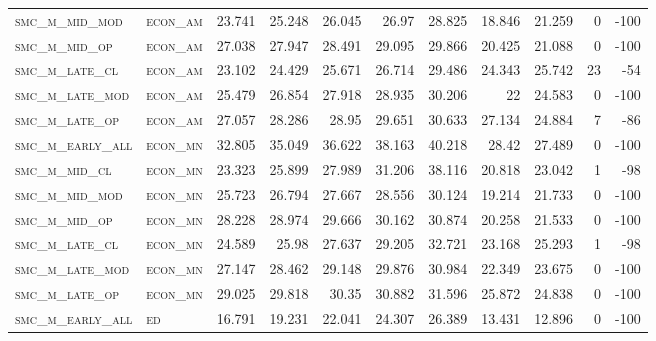 \begin{landscape}
\begin{center}
\begin{footnotesize}
\begin{longtable}{llrrrrrr|rrr}
\textsc{smc\_m\_mid\_mod  } & \textsc{econ\_am  }   & 23.741   & 25.248   & 26.045   & 26.97    & 28.825   & 18.846      & 21.259        & 0             & -100     \\
\textsc{smc\_m\_mid\_op   } & \textsc{econ\_am  }   & 27.038   & 27.947   & 28.491   & 29.095   & 29.866   & 20.425      & 21.088        & 0             & -100     \\
\textsc{smc\_m\_late\_cl  } & \textsc{econ\_am  }   & 23.102   & 24.429   & 25.671   & 26.714   & 29.486   & 24.343      & 25.742        & 23            & -54      \\
\textsc{smc\_m\_late\_mod } & \textsc{econ\_am  }   & 25.479   & 26.854   & 27.918   & 28.935   & 30.206   & 22          & 24.583        & 0             & -100     \\
\textsc{smc\_m\_late\_op  } & \textsc{econ\_am  }   & 27.057   & 28.286   & 28.95    & 29.651   & 30.633   & 27.134      & 24.884        & 7             & -86      \\
\textsc{smc\_m\_early\_all} & \textsc{econ\_mn  }   & 32.805   & 35.049   & 36.622   & 38.163   & 40.218   & 28.42       & 27.489        & 0             & -100     \\
\textsc{smc\_m\_mid\_cl   } & \textsc{econ\_mn  }   & 23.323   & 25.899   & 27.989   & 31.206   & 38.116   & 20.818      & 23.042        & 1             & -98      \\
\textsc{smc\_m\_mid\_mod  } & \textsc{econ\_mn  }   & 25.723   & 26.794   & 27.667   & 28.556   & 30.124   & 19.214      & 21.733        & 0             & -100     \\
\textsc{smc\_m\_mid\_op   } & \textsc{econ\_mn  }   & 28.228   & 28.974   & 29.666   & 30.162   & 30.874   & 20.258      & 21.533        & 0             & -100     \\
\textsc{smc\_m\_late\_cl  } & \textsc{econ\_mn  }   & 24.589   & 25.98    & 27.637   & 29.205   & 32.721   & 23.168      & 25.293        & 1             & -98      \\
\textsc{smc\_m\_late\_mod } & \textsc{econ\_mn  }   & 27.147   & 28.462   & 29.148   & 29.876   & 30.984   & 22.349      & 23.675        & 0             & -100     \\
\textsc{smc\_m\_late\_op  } & \textsc{econ\_mn  }   & 29.025   & 29.818   & 30.35    & 30.882   & 31.596   & 25.872      & 24.838        & 0             & -100     \\
\textsc{smc\_m\_early\_all} & \textsc{ed        }   & 16.791   & 19.231   & 22.041   & 24.307   & 26.389   & 13.431      & 12.896        & 0             & -100     \\

\end{longtable}
\end{footnotesize}
\end{center}
\end{landscape}
